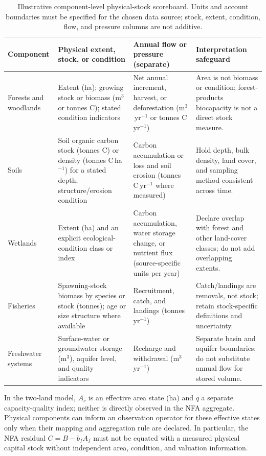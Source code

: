 \begin{table}[htbp]
\centering\footnotesize
\caption{Illustrative component-level physical-stock scoreboard. Units and account boundaries must be specified for the chosen data source; stock, extent, condition, flow, and pressure columns are not additive.}
\label{tab:si_stock_scoreboard}
\begin{tabularx}{\textwidth}{>{\raggedright\arraybackslash}p{} >{\raggedright\arraybackslash}p{} >{\raggedright\arraybackslash}p{} X}
\toprule
Component & Physical extent, stock, or condition & Annual flow or pressure (separate) & Interpretation safeguard \\
\midrule
Forests and woodlands & Extent (ha); growing stock or biomass (m$^3$ or tonnes C); stated condition indicators & Net annual increment, harvest, or deforestation (m$^3$\,yr$^{-1}$ or tonnes C\,yr$^{-1}$) & Area is not biomass or condition; forest-products biocapacity is not a direct stock measure. \\
Soils & Soil organic carbon stock (tonnes C) or density (tonnes C\,ha$^{-1}$) for a stated depth; structure/erosion condition & Carbon accumulation or loss and soil erosion (tonnes C\,yr$^{-1}$ where measured) & Hold depth, bulk density, land cover, and sampling method consistent across time. \\
Wetlands & Extent (ha) and an explicit ecological-condition class or index & Carbon accumulation, water storage change, or nutrient flux (source-specific units per year) & Declare overlap with forest and other land-cover classes; do not add overlapping extents. \\
Fisheries & Spawning-stock biomass by species or stock (tonnes); age or size structure where available & Recruitment, catch, and landings (tonnes\,yr$^{-1}$) & Catch/landings are removals, not stock; retain stock-specific definitions and uncertainty. \\
Freshwater systems & Surface-water or groundwater storage (m$^3$), aquifer level, and quality indicators & Recharge and withdrawal (m$^3$\,yr$^{-1}$) & Separate basin and aquifer boundaries; do not substitute annual flow for stored volume. \\
\bottomrule
\end{tabularx}
\end{table}

In the two-land model, $A_c$ is an effective area state (ha) and $q$ a separate capacity-quality index; neither is directly observed in the NFA aggregate. Physical components can inform an observation operator for these effective states only when their mapping and aggregation rule are declared. In particular, the NFA residual $C=B-b_fA_f$ must not be equated with a measured physical capital stock without independent area, condition, and valuation information.
